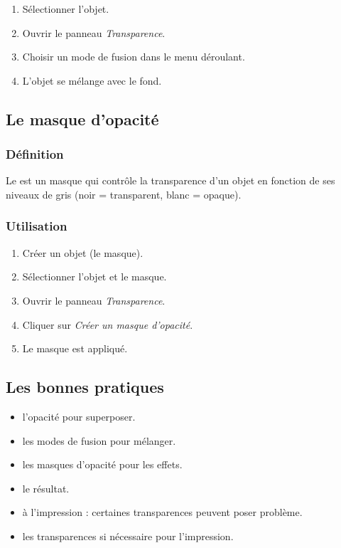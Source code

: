 \begin{enumerate}
    \item Sélectionner l'objet.
    \item Ouvrir le panneau \emph{Transparence}.
    \item Choisir un mode de fusion dans le menu déroulant.
    \item L'objet se mélange avec le fond.
\end{enumerate}

\subsection{Le masque d'opacité}

\subsubsection{Définition}

Le  est un masque qui contrôle la transparence d'un objet en fonction de ses niveaux de gris (noir = transparent, blanc = opaque).

\subsubsection{Utilisation}

\begin{enumerate}
    \item Créer un objet (le masque).
    \item Sélectionner l'objet et le masque.
    \item Ouvrir le panneau \emph{Transparence}.
    \item Cliquer sur \emph{Créer un masque d'opacité}.
    \item Le masque est appliqué.
\end{enumerate}

\subsection{Les bonnes pratiques}

\begin{itemize}
    \item {} l'opacité pour superposer.
    \item {} les modes de fusion pour mélanger.
    \item {} les masques d'opacité pour les effets.
    \item {} le résultat.
    \item {} à l'impression : certaines transparences peuvent poser problème.
    \item {} les transparences si nécessaire pour l'impression.
\end{itemize}

